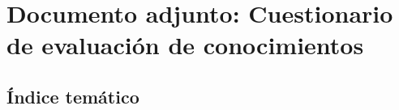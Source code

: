 %

\setcounter{page}{1}
\renewcommand{\thepage}{\hspace*{1em}B\arabic{page}}

{}
\section*{Documento adjunto: Cuestionario de evaluación de conocimientos}

%

\subsection*{Índice temático}


